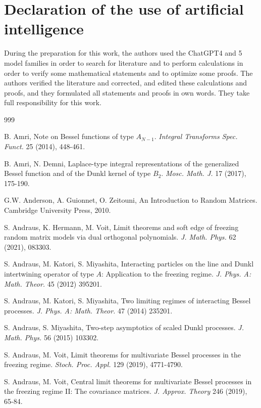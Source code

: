 \documentclass[reqno]{amsart}
\theoremstyle{plain}
\theoremstyle{definition}
\numberwithin{equation}{section}
\begin{document}
\section*{Declaration of the use of artificial intelligence} During the preparation for this work, the authors used the ChatGPT4 and 5 model families in order
to search for literature and to perform calculations in order to  verify some mathematical statements and to
optimize some proofs.
The authors verified the literature and corrected, and edited these  calculations and  proofs,
and they formulated all  statements and proofs in own words.
They take full responsibility for this work.


\begin{thebibliography}{999}

 B. Amri, Note on Bessel functions of type $A_{N-1}$.
  \textit{Integral Transforms Spec. Funct.} 25 (2014), 448-461.

 B. Amri, N.  Demni,
Laplace-type integral representations of the generalized Bessel function and of the Dunkl kernel of type $B_2$. 
\textit{Mosc. Math. J.} 17 (2017), 175-190. 
  
 G.W. Anderson, A. Guionnet, O. Zeitouni, 
  An Introduction to Random Matrices. Cambridge University Press, 2010.

  
   S. Andraus, K. Hermann, M. Voit,
  Limit theorems and soft edge of freezing random matrix models via dual orthogonal polynomials.
\textit{J. Math. Phys.} 62 (2021),  083303.

   S. Andraus, M. Katori, S. Miyashita, Interacting particles on the line 
and Dunkl intertwining operator of type $A$: Application to the freezing regime. 
\textit{J. Phys. A: Math. Theor. } 45  (2012) 395201.

 S. Andraus, M. Katori, S. Miyashita, 
Two limiting regimes of interacting Bessel processes. 
\textit{J. Phys. A: Math. Theor. } 47  (2014) 235201.

 S. Andraus, S. Miyashita, Two-step  asymptotics of scaled Dunkl processes.
\textit{J.  Math. Phys.} 56  (2015) 103302.


 
  S. Andraus, M. Voit, Limit theorems
 for multivariate Bessel processes in the freezing regime. \textit{Stoch. Proc. Appl. }
 129 (2019), 4771-4790.

 
  S. Andraus, M. Voit, Central limit theorems for multivariate Bessel processes in the freezing regime II: The covariance matrices. \textit{J. Approx. Theory}  246 (2019), 65-84. 
  

\end{thebibliography}
\end{document}
